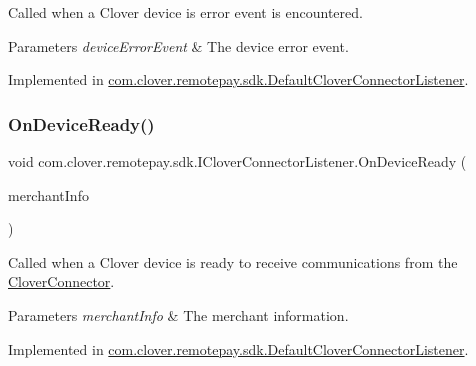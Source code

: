 Called when a Clover device is error event is encountered. 


\begin{DoxyParams}{Parameters}
{\em device\+Error\+Event} & The device error event.\\
\hline
\end{DoxyParams}


Implemented in \hyperlink{classcom_1_1clover_1_1remotepay_1_1sdk_1_1_default_clover_connector_listener_af1b973a12629519c039d2fa64da62606}{com.\+clover.\+remotepay.\+sdk.\+Default\+Clover\+Connector\+Listener}.

\mbox{\label{interfacecom_1_1clover_1_1remotepay_1_1sdk_1_1_i_clover_connector_listener_a6c7bff0d9fe64dc624fb175ef33e5299}} 
\subsubsection{\texorpdfstring{On\+Device\+Ready()}{OnDeviceReady()}}
{\footnotesize\ttfamily void com.\+clover.\+remotepay.\+sdk.\+I\+Clover\+Connector\+Listener.\+On\+Device\+Ready (\begin{DoxyParamCaption}\item[{\hyperlink{classcom_1_1clover_1_1remotepay_1_1sdk_1_1_merchant_info}{Merchant\+Info}}]{merchant\+Info }\end{DoxyParamCaption})}



Called when a Clover device is ready to receive communications from the \hyperlink{classcom_1_1clover_1_1remotepay_1_1sdk_1_1_clover_connector}{Clover\+Connector}. 


\begin{DoxyParams}{Parameters}
{\em merchant\+Info} & The merchant information.\\
\hline
\end{DoxyParams}


Implemented in \hyperlink{classcom_1_1clover_1_1remotepay_1_1sdk_1_1_default_clover_connector_listener_add16a6bfe009ef45650f9493425937b7}{com.\+clover.\+remotepay.\+sdk.\+Default\+Clover\+Connector\+Listener}.

